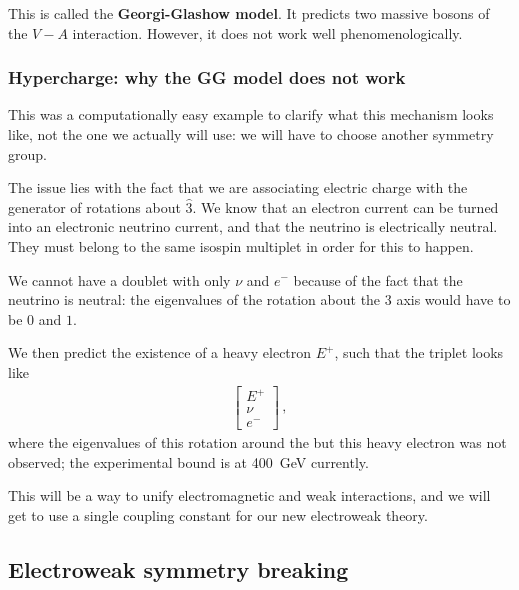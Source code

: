 \documentclass[main.tex]{subfiles}
\begin{document}
This is called the \textbf{Georgi-Glashow model}. It predicts two massive bosons of the \(V-A\) interaction. 
However, it does not work well phenomenologically. 

\subsubsection{Hypercharge: why the GG model does not work}

This was a computationally easy example to clarify what this mechanism looks like, not the one we actually will use: we will have to choose another symmetry group.

The issue lies with the fact that we are associating electric charge with the generator of rotations about \(\hat{3}\).
We know that an electron current can be turned into an electronic neutrino current, and that the neutrino is electrically neutral.
They must belong to the same isospin multiplet in order for this to happen.


We cannot have a doublet with only \(\nu \) and \(e^{-}\) because of the fact that the neutrino is neutral: the eigenvalues of the rotation about the \(3\) axis would have to be \(0\) and \(1\).


We then predict the existence of a heavy electron \(E^{+}\), such that the triplet looks like 
%
\begin{align}
\left[\begin{array}{c}
E^{+} \\ 
\nu  \\ 
e^{-}
\end{array}\right]
\,,
\end{align}
%
where the eigenvalues of this rotation around the 
but this heavy electron was not observed; the experimental bound is at \SI{400}{GeV} currently. 

This will be a way to unify electromagnetic and weak interactions, and we will get to use a single coupling constant for our new electroweak theory.

\subsection{Electroweak symmetry breaking}
\end{document}
